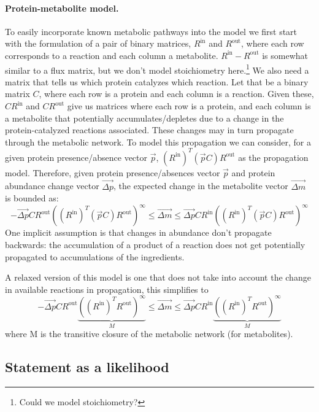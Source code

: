 \documentclass{article}
\begin{document}
\paragraph{Protein-metabolite model.}
To easily incorporate known metabolic pathways into the model we first start with the formulation of a pair of binary matrices, $R^\text{in}$ and $R^\text{out}$, where each row corresponds to a reaction and each column a metabolite.
$R^\text{in} - R^\text{out}$ is somewhat similar to a flux matrix, but we don't model stoichiometry here.\footnote{Could we model stoichiometry?}
We also need a matrix that tells us which protein catalyzes which reaction.
Let that be a binary matrix $C$, where each row is a protein and each column is a reaction.
Given these, $C R^\text{in}$ and $C R^\text{out}$ give us matrices where each row is a protein, and each column is a metabolite that potentially accumulates/depletes due to a change in the protein-catalyzed reactions associated.
These changes may in turn propagate through the metabolic network.
To model this propagation we can consider, for a given protein presence/absence vector $\vec p$, $(R^\text{in})^T ( \vec p C ) R^\text{out}$ as the propagation model.
Therefore, given protein presence/absences vector $\vec p$ and protein abundance change vector $\vec{\Delta p}$, the expected change in the metabolite vector $\vec{ \Delta m}$ is bounded as:
\[
 -\vec{\Delta p} C R^\text{out} ( (R^\text{in})^T ( \vec p C ) R^\text{out} )^\infty \leq \vec{ \Delta m} \leq \vec{\Delta p} C R^\text{in} ( (R^\text{in})^T ( \vec p C ) R^\text{out} )^\infty
\]
One implicit assumption is that changes in abundance don't propagate backwards: the accumulation of a product of a reaction does not get potentially propagated to accumulations of the ingredients.

A relaxed version of this model is one that does not take into account the change in available reactions in propagation, this simplifies to
\[
 -\vec{\Delta p} C R^\text{out} \underbrace{( (R^\text{in})^T R^\text{out} )^\infty}_M \leq \vec{ \Delta m} \leq \vec{\Delta p} C R^\text{in} \underbrace{( (R^\text{in})^T R^\text{out} )^\infty}_M
\]
where M is the transitive closure of the metabolic network (for metabolites).

\subsection{Statement as a likelihood}
\end{document}
